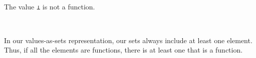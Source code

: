 \begin{fence}
\begin{code}%
\>[0]\AgdaSpace{}%
\AgdaSpace{}%
\AgdaSymbol{:}\AgdaSpace{}%
\AgdaSpace{}%
\AgdaSpace{}%
\AgdaSpace{}%
\<%
\\
\>[0][@{}l@{\AgdaIndent{0}}]%
\>[2]\AgdaSpace{}%
\AgdaSymbol{:}\AgdaSpace{}%
\AgdaSpace{}%
\AgdaSpace{}%
\AgdaSymbol{\}}\AgdaSpace{}%
\AgdaSpace{}%
\AgdaSpace{}%
\AgdaSpace{}%
\AgdaSymbol{(}\AgdaSpace{}%
\AgdaSpace{}%
\AgdaSymbol{)}\AgdaSpace{}%
\AgdaSpace{}%
\AgdaSpace{}%
\<%
\\
%
\\[\AgdaEmptyExtraSkip]%
\>[0]\AgdaSpace{}%
\AgdaSymbol{:}\AgdaSpace{}%
\AgdaSpace{}%
\AgdaSpace{}%
\<%
\\
\>[0]\AgdaSpace{}%
\AgdaSpace{}%
\AgdaSymbol{=}\AgdaSpace{}%
\AgdaSymbol{\}}\AgdaSpace{}%
\AgdaSpace{}%
\AgdaSpace{}%
\AgdaSpace{}%
\AgdaSpace{}%
\AgdaSpace{}%
\AgdaSpace{}%
\<%
\end{code}
\end{fence}

The value \texttt{⊥} is not a function.

\begin{fence}
\begin{code}%
\>[0]\AgdaSpace{}%
\AgdaSymbol{:}\AgdaSpace{}%
\AgdaSpace{}%
\AgdaSymbol{(}\AgdaSpace{}%
\AgdaSymbol{)}\<%
\\
\>[0]\AgdaSpace{}%
\AgdaSymbol{(}\AgdaSpace{}%
\AgdaSymbol{())}\<%
\end{code}
\end{fence}

In our values-as-sets representation, our sets always include at least
one element. Thus, if all the elements are functions, there is at least
one that is a function.

